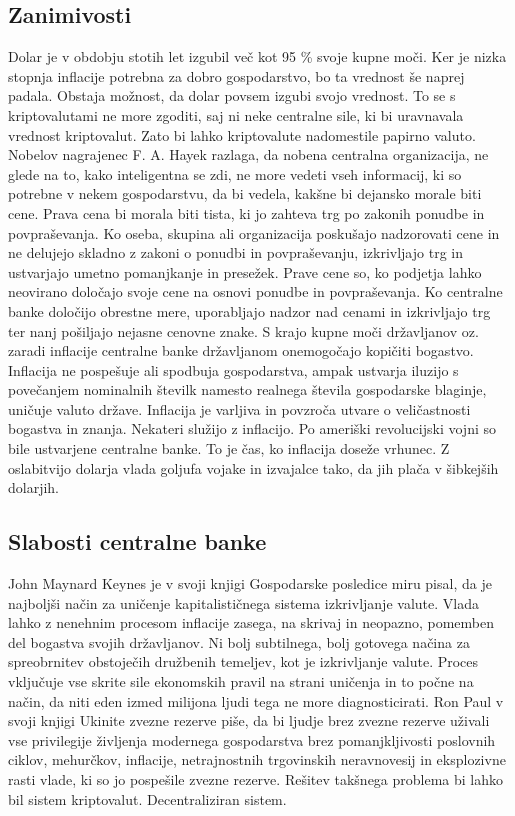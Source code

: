 \documentclass[letterpaper, titlepage, freqn]{article}
\begin{document}
\subsection{Zanimivosti}

 Dolar je v obdobju stotih let izgubil več kot 95 \% svoje kupne moči. Ker je nizka stopnja inflacije potrebna za dobro gospodarstvo, bo ta vrednost še naprej padala. Obstaja možnost, da dolar povsem izgubi svojo vrednost. To se s kriptovalutami ne more zgoditi, saj ni neke centralne sile, ki bi uravnavala vrednost kriptovalut. Zato bi lahko kriptovalute nadomestile papirno valuto.
Nobelov nagrajenec F. A. Hayek razlaga, da nobena centralna organizacija, ne glede na to, kako inteligentna se zdi, ne more vedeti vseh informacij, ki so potrebne v nekem gospodarstvu, da bi vedela, kakšne bi dejansko morale biti cene. Prava cena bi morala biti tista, ki jo zahteva trg po zakonih ponudbe in povpraševanja. Ko oseba, skupina ali organizacija poskušajo nadzorovati cene in ne delujejo skladno z zakoni o ponudbi in povpraševanju, izkrivljajo trg in ustvarjajo umetno pomanjkanje in presežek. Prave cene so, ko podjetja lahko neovirano določajo svoje cene na osnovi ponudbe in povpraševanja. Ko centralne banke določijo obrestne mere, uporabljajo nadzor nad cenami in izkrivljajo trg ter nanj pošiljajo nejasne cenovne znake.
S krajo kupne moči državljanov oz. zaradi inflacije centralne banke državljanom onemogočajo kopičiti bogastvo. Inflacija ne pospešuje ali spodbuja gospodarstva, ampak ustvarja iluzijo s povečanjem nominalnih številk namesto realnega števila gospodarske blaginje, uničuje valuto države. Inflacija je varljiva in povzroča utvare o veličastnosti bogastva in znanja. Nekateri služijo z inflacijo. Po ameriški revolucijski vojni so bile ustvarjene centralne banke. To je čas, ko inflacija doseže vrhunec. Z oslabitvijo dolarja vlada goljufa vojake in izvajalce tako, da jih plača v šibkejših dolarjih.\\

\subsection{Slabosti centralne banke}

John Maynard Keynes je v svoji knjigi Gospodarske posledice miru pisal, da je najboljši način za uničenje kapitalističnega sistema izkrivljanje valute. Vlada lahko z nenehnim procesom inflacije zasega, na skrivaj in neopazno, pomemben del bogastva svojih državljanov. Ni bolj subtilnega, bolj  gotovega načina za spreobrnitev obstoječih družbenih temeljev, kot je izkrivljanje valute. Proces vključuje vse skrite sile ekonomskih pravil na strani uničenja in to počne na način, da niti eden izmed milijona ljudi tega ne more diagnosticirati.
Ron Paul v svoji knjigi Ukinite zvezne rezerve piše, da bi ljudje brez zvezne rezerve uživali vse privilegije življenja modernega gospodarstva brez pomanjkljivosti poslovnih ciklov, mehurčkov, inflacije, netrajnostnih trgovinskih neravnovesij in eksplozivne rasti vlade, ki so jo pospešile zvezne rezerve.
Rešitev takšnega problema bi lahko bil sistem kriptovalut. Decentraliziran sistem.\\
\end{document}
